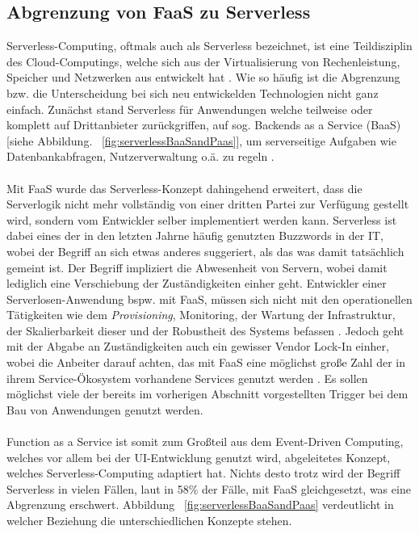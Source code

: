 \documentclass[11pt]{article}
\begin{document}
\subsection{Abgrenzung von FaaS zu Serverless}
Serverless-Computing, oftmals auch als Serverless bezeichnet, ist eine Teildisziplin des Cloud-Computings, welche sich aus der Virtualisierung von Rechenleistung, Speicher und Netzwerken aus entwickelt hat \cite{jackson2018investigation}. Wie so häufig ist die Abgrenzung bzw. die Unterscheidung bei sich neu entwickelden Technologien nicht ganz einfach. Zunächst stand Serverless für Anwendungen welche teilweise oder komplett auf Drittanbieter zurückgriffen, auf sog. Backends as a Service (BaaS) [siehe Abbildung. ~\ref{fig:serverlessBaaSandPaas}], um serverseitige Aufgaben wie Datenbankabfragen, Nutzerverwaltung o.ä. zu regeln \cite{fowler2018serverless}.\\\\
Mit FaaS wurde das Serverless-Konzept dahingehend erweitert, dass die Serverlogik nicht mehr vollständig von einer dritten Partei zur Verfügung gestellt wird, sondern vom Entwickler selber implementiert werden kann. Serverless ist dabei eines der in den letzten Jahrne häufig genutzten Buzzwords in der IT, wobei der Begriff an sich etwas anderes suggeriert, als das was damit tatsächlich gemeint ist. Der Begriff impliziert die Abwesenheit von Servern, wobei damit lediglich eine Verschiebung der Zuständigkeiten einher geht. Entwickler einer \glqq Serverlosen\grqq{}-Anwendung bspw. mit FaaS, müssen sich nicht mit den operationellen Tätigkeiten wie dem \textit{Provisioning}, Monitoring, der Wartung der Infrastruktur, der Skalierbarkeit dieser und der Robustheit des Systems befassen \cite{baldini2017serverless}. Jedoch geht mit der Abgabe an Zuständigkeiten auch ein gewisser Vendor Lock-In einher, wobei die Anbeiter darauf achten, das mit FaaS eine möglichst große Zahl der in ihrem Service-Ökosystem vorhandene Services genutzt werden \cite{kritikos2018review}. Es sollen möglichst viele der bereits im vorherigen Abschnitt vorgestellten Trigger bei dem Bau von Anwendungen genutzt werden.\\\\
Function as a Service ist somit zum Großteil aus dem Event-Driven Computing, welches vor allem bei der UI-Entwicklung genutzt wird, abgeleitetes Konzept, welches Serverless-Computing adaptiert hat. Nichts desto trotz wird der Begriff Serverless in vielen Fällen, laut \cite{leitner2019mixed} in 58\% der Fälle, mit FaaS gleichgesetzt, was eine Abgrenzung erschwert. Abbildung ~\ref{fig:serverlessBaaSandPaas} verdeutlicht in welcher Beziehung die unterschiedlichen Konzepte stehen. 
\end{document}
